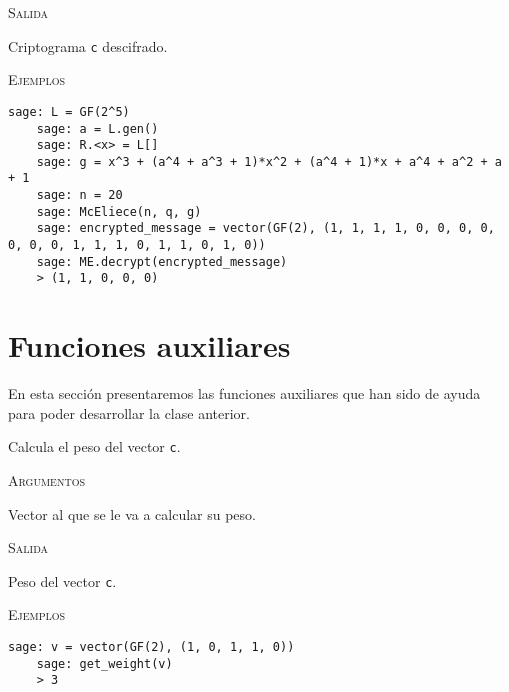\begin{description}[leftmargin=1em, font=\normalfont\ttfamily, style=nextline]
\begin{description}[font=\ttfamily, style=nextline]
  \textsc{Salida}
  \begin{description}[font=\normalfont\ttfamily]
    \item[] Criptograma \texttt{c} descifrado.
  \end{description}

  \textsc{Ejemplos}
  \begin{lstlisting}[gobble=4]
    sage: L = GF(2^5)
    sage: a = L.gen()
    sage: R.<x> = L[]
    sage: g = x^3 + (a^4 + a^3 + 1)*x^2 + (a^4 + 1)*x + a^4 + a^2 + a + 1
    sage: n = 20
    sage: McEliece(n, q, g)
    sage: encrypted_message = vector(GF(2), (1, 1, 1, 1, 0, 0, 0, 0, 0, 0, 0, 1, 1, 1, 0, 1, 1, 0, 1, 0))
    sage: ME.decrypt(encrypted_message)
    > (1, 1, 0, 0, 0)
  \end{lstlisting}
  \end{description}
\end{description}

\section{Funciones auxiliares}

En esta sección presentaremos las funciones auxiliares que han sido de ayuda para poder desarrollar la clase anterior.

\begin{description}[leftmargin=1em, font=\normalfont\ttfamily, style=nextline]
  \item[get\_weight(c)] Calcula el peso del vector \texttt{c}.

  \textsc{Argumentos}
  \begin{description}[font=\normalfont\ttfamily]
    \item[c] Vector al que se le va a calcular su peso.
  \end{description}

  \textsc{Salida}
  \begin{description}[font=\normalfont\ttfamily]
    \item[] Peso del vector \texttt{c}.
  \end{description}

  \textsc{Ejemplos}
  \begin{lstlisting}[gobble=4]
    sage: v = vector(GF(2), (1, 0, 1, 1, 0))
    sage: get_weight(v)
    > 3
  \end{lstlisting}
\end{description}
